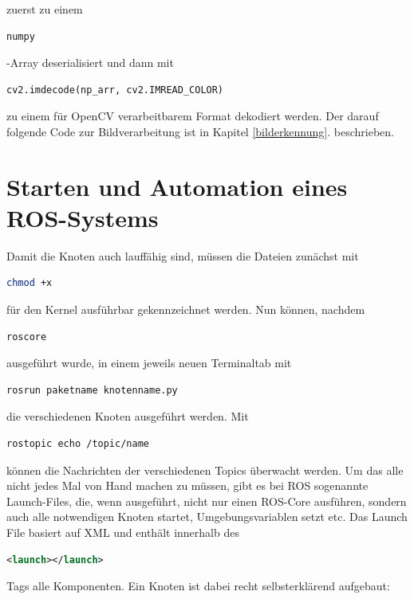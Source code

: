 zuerst zu einem 

\begin{lstlisting}[language=Python]
numpy
\end{lstlisting}-Array deserialisiert und dann mit 

\begin{lstlisting}[language=Python]
cv2.imdecode(np_arr, cv2.IMREAD_COLOR)
\end{lstlisting}

zu einem für OpenCV verarbeitbarem Format dekodiert werden. Der darauf folgende Code zur Bildverarbeitung ist in Kapitel \ref{bilderkennung}. beschrieben. 
\cite{aniskoubaa2019}

\section{Starten und Automation eines ROS-Systems}
Damit die Knoten auch lauffähig sind, müssen die Dateien zunächst mit 

\begin{lstlisting}[language=bash]
chmod +x
\end{lstlisting}

für den Kernel ausführbar gekennzeichnet werden. Nun können, nachdem 

\begin{lstlisting}[language=bash]
roscore
\end{lstlisting}

ausgeführt wurde, in einem jeweils neuen Terminaltab mit 

\begin{lstlisting}[language=bash]
rosrun paketname knotenname.py
\end{lstlisting}

die verschiedenen Knoten ausgeführt werden. Mit 

\begin{lstlisting}[language=bash]
rostopic echo /topic/name
\end{lstlisting}

können die Nachrichten der verschiedenen Topics überwacht werden. Um das alle nicht jedes Mal von Hand machen zu müssen, gibt es bei ROS sogenannte Launch-Files, die, wenn ausgeführt, nicht nur einen ROS-Core ausführen, sondern auch alle notwendigen Knoten startet, Umgebungsvariablen setzt etc. Das Launch File basiert auf XML und enthält innerhalb des 

\begin{lstlisting}[language=xml]
<launch></launch>
\end{lstlisting}Tags alle Komponenten. Ein Knoten ist dabei recht selbsterklärend aufgebaut: 

